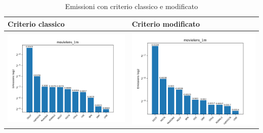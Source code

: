 \begin{table}[H]
    \centering
    \footnotesize
    \setlength\tabcolsep{0pt}
    \begin{tabularx}{\textwidth}{|X|X|}
        \hline
        \textbf{Criterio classico} & \textbf{Criterio modificato} \\
        \hline
        \includegraphics[width=\linewidth, trim=0 0 0 0]{images/emissions_movielens_1m_40_5_earlyClassic.png} &
        \includegraphics[width=\linewidth, trim=0 0 0 0]{images/emissions_movielens_1m_40_5_earlyModified.png} \\
        \hline
    \end{tabularx}
    \caption{Emissioni con criterio classico e modificato}
    \label{tab:emissions_info}
\end{table}



